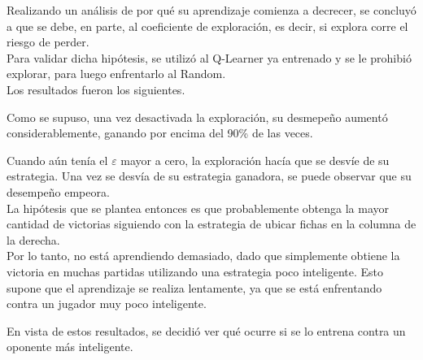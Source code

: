 Realizando un análisis de por qué su aprendizaje comienza a decrecer, se concluyó a que se debe, en parte, al coeficiente de exploración, es decir, si explora corre el riesgo de  perder.\\
Para validar dicha hipótesis, se utilizó al Q-Learner ya entrenado y se le prohibió explorar, para luego enfrentarlo al Random.\\
Los resultados fueron los siguientes.



Como se supuso, una vez desactivada la exploración, su desmepeño aumentó considerablemente, ganando por encima del 90\% de las veces.

Cuando aún tenía el $\varepsilon$ mayor a cero, la exploración hacía que se desvíe de su estrategia. Una vez se desvía de su estrategia ganadora, se puede observar que su desempeño empeora.\\
La hipótesis que se plantea entonces es que probablemente obtenga la mayor cantidad de victorias siguiendo con la estrategia de ubicar fichas en la columna de la derecha.\\ Por lo tanto, no está aprendiendo demasiado, dado que simplemente obtiene la victoria en muchas partidas utilizando una estrategia poco inteligente. Esto supone que el aprendizaje se realiza lentamente, ya que se está enfrentando contra un jugador muy poco inteligente.

En vista de estos resultados, se decidió ver qué ocurre si se lo entrena contra un oponente más inteligente.
